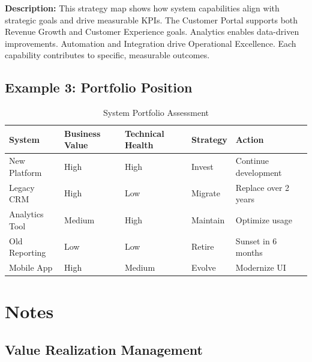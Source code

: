 \documentclass[11pt,letterpaper]{article}
\begin{document}
\textbf{Description:} This strategy map shows how system capabilities align with strategic goals and drive measurable KPIs. The Customer Portal supports both Revenue Growth and Customer Experience goals. Analytics enables data-driven improvements. Automation and Integration drive Operational Excellence. Each capability contributes to specific, measurable outcomes.

\subsection{Example 3: Portfolio Position}

\begin{table}[H]
\centering
\caption{System Portfolio Assessment}
\small
\begin{tabular}{@{}L{2.5cm}C{1.8cm}C{1.8cm}C{1.8cm}L{3.5cm}@{}}
\toprule
\textbf{System} & \textbf{Business Value} & \textbf{Technical Health} & \textbf{Strategy} & \textbf{Action} \\
\midrule
New Platform & High & High & Invest & Continue development \\
\addlinespace
Legacy CRM & High & Low & Migrate & Replace over 2 years \\
\addlinespace
Analytics Tool & Medium & High & Maintain & Optimize usage \\
\addlinespace
Old Reporting & Low & Low & Retire & Sunset in 6 months \\
\addlinespace
Mobile App & High & Medium & Evolve & Modernize UI \\
\bottomrule
\end{tabular}
\end{table}

\section{Notes}

\subsection{Value Realization Management}
\end{document}
